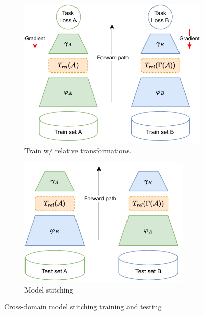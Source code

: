 \documentclass[../main.tex]{subfiles}
\begin{document}
\begin{figure}[ht!]
     \centering
    \begin{subfigure}[b]{0.45\textwidth}
         \centering
         \includegraphics[width=\textwidth]{figures/bg/relativeTrainScheme.pdf}
        \caption{Train w/ relative transformations.}
         \label{fig:relTrainScheme}
     \end{subfigure}\hfill
      \begin{subfigure}[b]{0.45\textwidth}
         \centering
         \includegraphics[width=0.9\textwidth]{figures/bg/relativeStitchScheme.pdf}
        \caption{Model stitching}
         \label{fig:relStitchScheme}
     \end{subfigure}
    \caption{Cross-domain model stitching training and testing}
    \label{fig:crossDomainScheme}
\end{figure}
\end{document}
